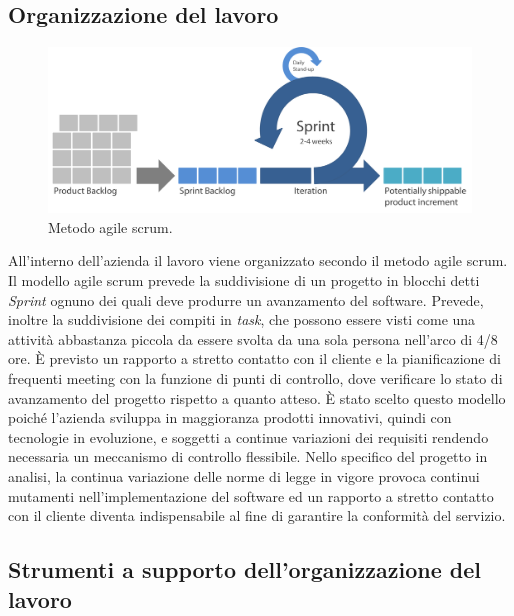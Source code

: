 \subsection{Organizzazione del lavoro}
\begin{figure}[H]
\begin{center}
\includegraphics[width=12cm]{Pics/scrum.png}
\caption{Metodo agile scrum.}
\end{center}
\end{figure}
All'interno dell'azienda il lavoro viene organizzato secondo il metodo agile scrum.  \\
Il modello agile scrum prevede la suddivisione di un progetto in blocchi detti \textit{Sprint} ognuno dei quali deve produrre un avanzamento del software. Prevede, inoltre la suddivisione dei compiti in \textit{task}, che possono essere visti come una attività abbastanza piccola da essere svolta da una sola persona nell'arco di 4/8 ore. È previsto un rapporto a stretto contatto con il cliente e la pianificazione di frequenti meeting con la funzione di punti di controllo, dove verificare lo stato di avanzamento del progetto rispetto a quanto atteso.
È stato scelto questo modello poiché l'azienda sviluppa in maggioranza prodotti innovativi, quindi con tecnologie in evoluzione, e soggetti a continue variazioni dei requisiti rendendo necessaria un meccanismo di controllo flessibile. Nello specifico del progetto in analisi, la continua variazione delle norme di legge in vigore provoca continui mutamenti nell'implementazione del software ed un rapporto a stretto contatto con il cliente diventa indispensabile al fine di garantire la conformità del servizio.

\subsection{Strumenti a supporto dell'organizzazione del lavoro}

